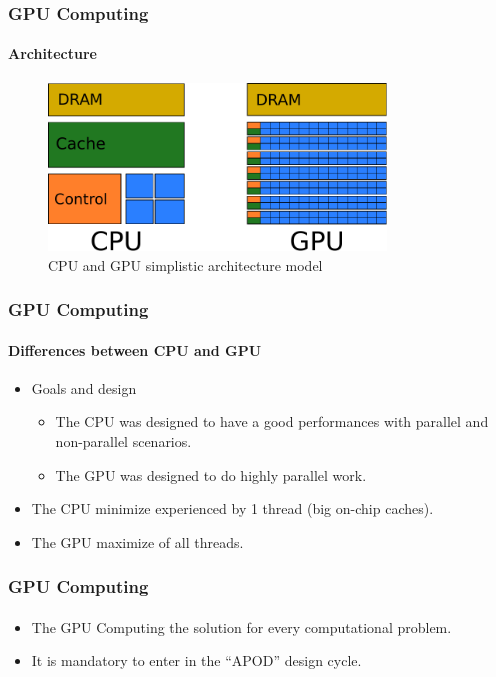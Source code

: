 \begin{frame}
    \frametitle{GPU Computing}
    \framesubtitle{Architecture}
    \begin{figure}
        \centering
        \label{fig:architecture}
        \includegraphics[width=0.8\textwidth]{img/architecture.pdf}
        \caption{CPU and GPU simplistic architecture model}
    \end{figure}
\end{frame}

\begin{frame}
    \frametitle{GPU Computing}
    \framesubtitle{Differences between CPU and GPU}
    \begin{itemize}
        \item Goals and design
        \begin{itemize}
            \item The CPU was designed to have a good performances with parallel and non-parallel
                  scenarios.
            \item The GPU was designed to do highly parallel work.
        \end{itemize}
        \item The CPU minimize  experienced by 1 thread (big on-chip caches).
        \item The GPU maximize  of all threads.
    \end{itemize}
\end{frame}

\begin{frame}
    \frametitle{GPU Computing}
    \framesubtitle{}
    \begin{itemize}
        \item The GPU Computing  the solution for every computational problem.
        \item It is mandatory to enter in the ``APOD'' design cycle.
    \end{itemize}
\end{frame}

